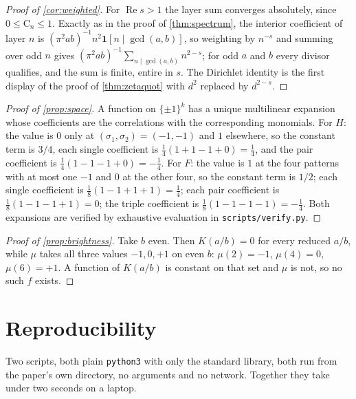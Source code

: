 \documentclass[11pt]{amsart}
\theoremstyle{definition}
\theoremstyle{remark}
\begin{document}
\begin{proof}[Proof of \cref{cor:weighted}]
For $\operatorname{Re} s > 1$ the layer sum converges absolutely, since $0 \le \mathrm{C}_n \le 1$. Exactly as in the proof of \cref{thm:spectrum}, the interior coefficient of layer $n$ is $(\pi^2 ab)^{-1} n^2 \mathbf 1[n \mid \gcd(a,b)]$, so weighting by $n^{-s}$ and summing over odd $n$ gives $(\pi^2 ab)^{-1} \sum_{n \mid \gcd(a,b)} n^{2-s}$; for odd $a$ and $b$ every divisor qualifies, and the sum is finite, entire in $s$. The Dirichlet identity is the first display of the proof of \cref{thm:zetaquot} with $d^2$ replaced by $d^{2-s}$.
\end{proof}

\begin{proof}[Proof of \cref{prop:space}]
A function on $\{\pm1\}^k$ has a unique multilinear expansion whose coefficients are the correlations with the corresponding monomials. For $H$: the value is $0$ only at $(\sigma_1,\sigma_2)=(-1,-1)$ and $1$ elsewhere, so the constant term is $3/4$, each single coefficient is $\frac14(1+1-1+0)=\frac14$, and the pair coefficient is $\frac14(1-1-1+0)=-\frac14$. For $F$: the value is $1$ at the four patterns with at most one $-1$ and $0$ at the other four, so the constant term is $1/2$; each single coefficient is $\frac18(1-1+1+1)=\frac14$; each pair coefficient is $\frac18(1-1-1+1)=0$; the triple coefficient is $\frac18(1-1-1-1)=-\frac14$. Both expansions are verified by exhaustive evaluation in \texttt{scripts/verify.py}.
\end{proof}

\begin{proof}[Proof of \cref{prop:brightness}]
Take $b$ even. Then $K(a/b)=0$ for every reduced $a/b$, while $\mu$ takes all three values $-1,0,+1$ on even $b$: $\mu(2)=-1$, $\mu(4)=0$, $\mu(6)=+1$. A function of $K(a/b)$ is constant on that set and $\mu$ is not, so no such $f$ exists.
\end{proof}

\section{Reproducibility}
\label{sec:repro}

Two scripts, both plain \texttt{python3} with only the standard library, both run from the paper's own directory, no arguments and no network. Together they take under two seconds on a laptop.
\end{document}
